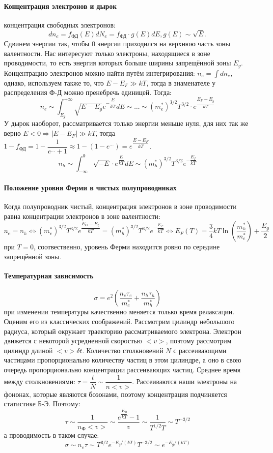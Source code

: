 \paragraph{Концентрация электронов и дырок} концентрация свободных электронов:
\[
  dn_e = f_\text{ФД} (E) dN_e = f_\text{ФД} \cdot g(E) dE, g(E) \sim \sqrt{E}.
\]
Сдвинем энергии так, чтобы 0 энергии приходился на верхнюю часть зоны валентности. 
Нас интересуют только электроны, находящиеся в зоне проводимости, то есть энергия которых
больше ширины запрещённой зоны $E_g$. Концентрацию электронов можно найти путём интегрирования:
$n_e = \int dn_e$, однако, используем также то, что $E-E_F \gg kT$, тогда в знаменателе у
распределения Ф-Д можно пренебречь единицей. Тогда:
\[
  n_e \sim \int_{E_g}^{+\infty} \sqrt{E-E_g} e^{-\dfrac{E}{kT}} dE \sim \dots
  \sim (m_e^*)^{3/2} T^{3/2} \cdot e^{\dfrac{E_F - E_g}{kT}}
\]
У дырок наоборот, рассматривается только энергии меньше нуля, для них так же верно
$E<0 \Rightarrow |E-E_F| \gg kT$, тогда
$1 - f_\text{ФД} = 1 - \dfrac{1}{e^{\dots} + 1} \approx 1 - \left( 1 - e^{\dots} \right) = e^{\dfrac{E-E_F}{kT}} $. 
\[
  n_h \sim \int_{-\infty}^0 \sqrt{-E} \cdot e^{\dfrac{E}{kT}} dE \sim (m_h^*)^{3/2} T^{3/2} e^{-\dfrac{E_f}{kT}}
\]

\paragraph{Положение уровня Ферми в чистых полупроводниках}

Когда полупроводник чистый, концентрация электронов в зоне проводимости равна концентрации электронов в зоне валентности:
\[
  n_e = n_h \Leftrightarrow (m_e^*)^{3/2} T^{3/2} e^{\dfrac{E_G - E_g}{kT}} = (m_h^*)^{3/2} T^{3/2} e^{-\dfrac{E_F}{kT}} 
  \Leftrightarrow
  E_F(T) = \dfrac{3}{4} kT \ln (\dfrac{m_h^*}{m_e^*}) + \dfrac{E_g}{2}
\]
при $T = 0$, соотвественно, уровень Ферми находится ровно по середине запрещённой зоны.

\paragraph{Температурная зависимость}
\[
  \sigma = e^2 \left( \dfrac{n_e \tau_e}{m_e^*} + \dfrac{n_h \tau_h}{m_h^*} \right) 
\]
при изменении температуры качественно меняется только время релаксации. Оценим его из классических соображений. Рассмотрим цилиндр небольшого радиуса, который окружает траекторию рассматриваемого электрона. Электрон движется с некоторой усредненной скоростью $<v>$, поэтому рассмотрим цилиндр длиной $<v> \delta t$. Количество столкновений $N$ с рассеивающими частицами пропорционально количеству частиц в этом цилиндре, а оно в свою очередь пропорционально концентрации рассеивающих частиц. Среднее время между столкновениями: $\tau = \dfrac{t}{N} \sim \dfrac{1}{n <v>}$. Рассеиваются наши электроны на фононах, которые являются бозонами, поэтому концентрация подчиняется статистике Б-Э. Поэтому:
\[
  \tau \sim \dfrac{1}{n_\text{Ф} <v>} \sim \dfrac{e^{\dfrac{E_0}{kT}} - 1}{v}
  \sim \dfrac{1}{T^{1/2} T} \sim T^{-3/2}
\]
а проводимость в таком случае:
\[
  \sigma \sim n_e \tau \sim T^{3/2} e^{-E_g / (kT)} T^{-3/2} \sim e^{-E_g / (kT)}
\]
